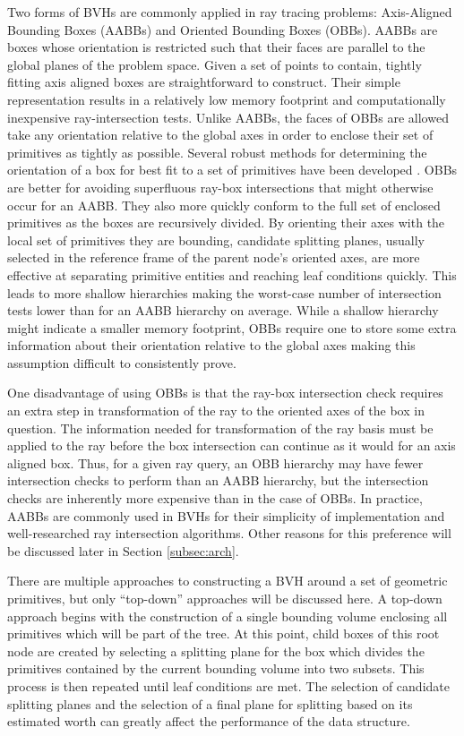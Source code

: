 Two forms of BVHs are commonly applied in ray tracing problems: Axis-Aligned
Bounding Boxes (AABBs) and Oriented Bounding Boxes (OBBs). AABBs are boxes whose
orientation is restricted such that their faces are parallel to the global
planes of the problem space. Given a set of points to contain, tightly fitting
axis aligned boxes are straightforward to construct. Their simple representation
results in a relatively low memory footprint and computationally inexpensive
ray-intersection tests. Unlike AABBs, the faces of OBBs are allowed take any
orientation relative to the global axes in order to enclose their set of
primitives as tightly as possible. Several robust methods for determining the
orientation of a box for best fit to a set of primitives have been developed
\cite{Gottschalk_1996,ORourke_1985}. OBBs are better for avoiding superfluous
ray-box intersections that might otherwise occur for an AABB. They also more
quickly conform to the full set of enclosed primitives as the boxes are
recursively divided. By orienting their axes with the local set of primitives
they are bounding, candidate splitting planes, usually selected in the reference
frame of the parent node's oriented axes, are more effective at separating
primitive entities and reaching leaf conditions quickly. This leads to more
shallow hierarchies making the worst-case number of intersection tests lower
than for an AABB hierarchy on average. While a shallow hierarchy might indicate
a smaller memory footprint, OBBs require one to store some extra information
about their orientation relative to the global axes making this assumption
difficult to consistently prove.

One disadvantage of using OBBs is that the ray-box intersection check requires
an extra step in transformation of the ray to the oriented axes of the box in
question. The information needed for transformation of the ray basis must be
applied to the ray before the box intersection can continue as it would for an
axis aligned box. Thus, for a given ray query, an OBB hierarchy may have fewer
intersection checks to perform than an AABB hierarchy, but the intersection
checks are inherently more expensive than in the case of OBBs. In practice,
AABBs are commonly used in BVHs for their simplicity of implementation and
well-researched ray intersection algorithms. Other reasons for this preference
will be discussed later in Section \ref{subsec:arch}.

There are multiple approaches to constructing a BVH around a set
of geometric primitives, but only ``top-down'' approaches will be discussed
here. A top-down approach begins with the construction of a single bounding
volume enclosing all primitives which will be part of the tree. At this point,
child boxes of this root node are created by selecting a splitting plane for
the box which divides the primitives contained by the current bounding volume
into two subsets. This process is then repeated until leaf conditions are
met. The selection of candidate splitting planes and the selection of a final
plane for splitting based on its estimated worth can greatly affect the
performance of the data structure.

